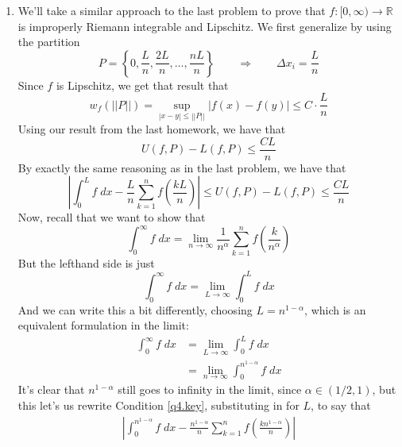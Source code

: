 \documentclass[12pt]{article}
\theoremstyle{plain}
\theoremstyle{definition}
\theoremstyle{remark}
\begin{document}
\begin{enumerate}
\newpage
\item We'll take a similar approach to the last problem to prove that $f: [0,\infty) \rightarrow \mathbb{R}$ is improperly Riemann integrable and Lipschitz. We first generalize by using the partition 
\begin{equation}
    P = \left\{ 0, \frac{L}{n},\frac{2L}{n}, \ldots,\frac{nL}{n}\right\}
    \qquad \Rightarrow \qquad
    \Delta x_i = \frac{L}{n}
\end{equation}
Since $f$ is Lipschitz, we get that result that 
\begin{equation}
    w_f\left(||P||\right) = \sup_{|x-y|\leq ||P||} |f(x) - f(y)| \leq C \cdot \frac{L}{n}
\end{equation}
Using our result from the last homework, we have that
\begin{equation}
    U(f, P) - L(f,P) \leq \frac{CL}{n}
\end{equation}
By exactly the same reasoning as in the last problem, we have that 
\begin{equation}
    \label{q4.key}
     \left\lvert \int^L_0 f \; dx -  
        \frac{L}{n} \sum^n_{k=1} f\left(\frac{kL}{n} \right) 
        \right\rvert\leq 
        U(f,P) - L(f,P) \leq \frac{CL}{n} 
\end{equation}
Now, recall that we want to show that 
\begin{equation}
    \int^\infty_0 f \; dx = \lim_{n\rightarrow\infty} \frac{1}{n^\alpha} 
        \sum^n_{k=1} f\left(\frac{k}{n^\alpha}\right)
\end{equation}
But the lefthand side is just 
\begin{equation}
    \int^\infty_0 f \; dx = \lim_{L\rightarrow\infty} \int^L_0 f\;dx
\end{equation}
And we can write this a bit differently, choosing $L = n^{1-\alpha}$, which is an equivalent formulation in the limit:
\begin{align*}
    \int^\infty_0 f \; dx &= \lim_{L\rightarrow\infty} \int^L_0 f\;dx \\
    &= \lim_{n\rightarrow\infty} \int^{n^{1-\alpha}}_0 f \; dx 
\end{align*}
It's clear that $n^{1-\alpha}$ still goes to infinity in the limit, since $\alpha \in (1/2, 1)$, but this let's us rewrite Condition \ref{q4.key}, substituting in for $L$, to say that 
\begin{align*}
     \left\lvert \int^{n^{1-\alpha}}_0 f \; dx -  
        \frac{{n^{1-\alpha}}}{n} \sum^n_{k=1} f\left(\frac{k{n^{1-\alpha}}}{n} \right) 
        \right\rvert

\end{align*}
\end{enumerate}
\end{document}
